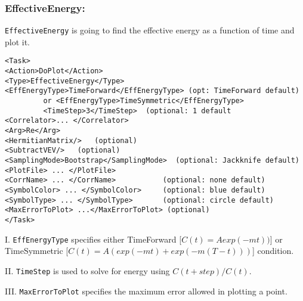 \documentclass[12pt]{article}
\newcommand{\vb}{\texttt}
\begin{document}
\subsubsection{EffectiveEnergy:}
\vb{EffectiveEnergy} is going to find the effective energy as a function of time and plot it.
\begin{verbatim}
<Task>
<Action>DoPlot</Action>
<Type>EffectiveEnergy</Type>
<EffEnergyType>TimeForward</EffEnergyType> (opt: TimeForward default)
         or <EffEnergyType>TimeSymmetric</EffEnergyType>
         <TimeStep>3</TimeStep>  (optional: 1 default
<Correlator>... </Correlator>
<Arg>Re</Arg>
<HermitianMatrix/>   (optional)
<SubtractVEV/>   (optional)
<SamplingMode>Bootstrap</SamplingMode>  (optional: Jackknife default)
<PlotFile> ... </PlotFile>
<CorrName> ... </CorrName>           (optional: none default)
<SymbolColor> ... </SymbolColor>     (optional: blue default)
<SymbolType> ... </SymbolType>       (optional: circle default)
<MaxErrorToPlot> ...</MaxErrorToPlot> (optional)
</Task> 
\end{verbatim}

I. \vb{EffEnergyType} specifies either TimeForward [$C(t) = Aexp(-mt))$]  or TimeSymmetric [$C(t) = A(exp(-mt)+exp(-m(T-t)))$] condition.

II. \vb{TimeStep} is used to solve for energy using $C(t+step)/C(t)$.                   

III. \vb{MaxErrorToPlot} specifies the maximum error allowed in plotting a point.
\end{document}
